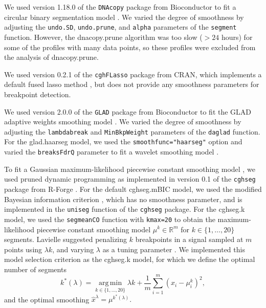\documentclass[10pt]{bmc_article}
\newcommand{\citep}[1]{\cite{#1}}
\newcommand{\argmin}{\operatorname*{arg\, min}}
\newcommand{\model}[1]{#1}
\newcommand{\code}[1]{\texttt{#1}}
\newcommand{\package}[1]{\texttt{#1}}
\newcommand{\RR}{\mathbb R}
\newenvironment{bmcformat}{\begin{raggedright}\baselineskip20pt\sloppy\setboolean{publ}{false}}{\end{raggedright}\baselineskip20pt\sloppy}
\begin{document}
\begin{bmcformat}
We used version 1.18.0 of the \package{DNAcopy} package from
Bioconductor to fit a circular binary segmentation model
\cite{dnacopy}. We varied the degree of smoothness by adjusting the
\code{undo.SD}, \code{undo.prune}, and \code{alpha} parameters of the
\code{segment} function.  However, the dnacopy.prune algorithm was too
slow ($>24$ hours) for some of the profiles with many data points, so
these profiles were excluded from the analysis of dnacopy.prune.

We used version 0.2.1 of the \package{cghFLasso} package from CRAN,
which implements a default fused lasso method \cite{cghFLasso}, but
does not provide any smoothness parameters for breakpoint detection.

We used version 2.0.0 of the \package{GLAD} package from Bioconductor
to fit the GLAD adaptive weights smoothing model \cite{glad}. We
varied the degree of smoothness by adjusting the \code{lambdabreak}
and \code{MinBkpWeight} parameters of the \code{daglad} function. For
the \model{glad.haarseg} model, we used the
\code{smoothfunc="haarseg"} option and varied the \texttt{breaksFdrQ}
parameter to fit a wavelet smoothing model \cite{haarseg}.

To fit a Gaussian maximum-likelihood piecewise constant smoothing
model \cite{statistical-approach}, we used pruned dynamic programming
as implemented in version 0.1 of the \package{cghseg} package from
R-Forge \citep{pruned-dp}. For the default \model{cghseg.mBIC} model,
we used the modified Bayesian information criterion 
\cite{mBIC}, which has no smoothness parameter, and is implemented in
the \code{uniseg} function of the \package{cghseg} package.  For the
\model{cghseg.k} model, we used the \code{segmeanCO} function with
\code{kmax=20} to obtain the maximum-likelihood piecewise constant
smoothing model $\mu^k\in\RR^m$ for $k\in\{1, \dots, 20\}$ segments.
Lavielle suggested penalizing $k$ breakpoints in a signal sampled at
$m$ points using $\lambda k$, and varying $\lambda$ as a tuning
parameter \cite{lavielle2005}. We implemented this model selection
criterion as the \model{cghseg.k} model, for which we define the
optimal number of segments
\begin{equation}
  \label{eq:cghseg.k}
  k^*(\lambda) = 
\argmin_{k\in\{1,\dots,20\}}
\lambda k+  \frac 1 m \sum_{i=1}^m (x_i-\mu_i^k)^2,
\end{equation}
and the optimal smoothing $
  \hat x^\lambda = \mu^{k^*(\lambda)}.
$


\end{bmcformat}
\end{document}
